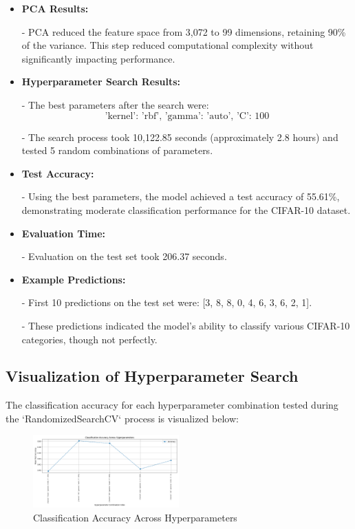 \documentclass[lettersize,journal]{IEEEtran}
\begin{document}
\begin{itemize}
    \item \textbf{PCA Results:}
    
    - PCA reduced the feature space from 3,072 to 99 dimensions, retaining 90\% of the variance. This step reduced computational complexity without significantly impacting performance.

    \item \textbf{Hyperparameter Search Results:}
    
    - The best parameters after the search were:
        \[
        \text{{'kernel': 'rbf', 'gamma': 'auto', 'C': 100}}
        \]
    
    - The search process took 10,122.85 seconds (approximately 2.8 hours) and tested 5 random combinations of parameters.

    \item \textbf{Test Accuracy:}
    
    - Using the best parameters, the model achieved a test accuracy of 55.61\%, demonstrating moderate classification performance for the CIFAR-10 dataset.

    \item \textbf{Evaluation Time:}
    
    - Evaluation on the test set took 206.37 seconds.

    \item \textbf{Example Predictions:}
    
    - First 10 predictions on the test set were: [3, 8, 8, 0, 4, 6, 3, 6, 2, 1].
    
    - These predictions indicated the model’s ability to classify various CIFAR-10 categories, though not perfectly.
\end{itemize}

\subsection{\textbf{Visualization of Hyperparameter Search}}
The classification accuracy for each hyperparameter combination tested during the `RandomizedSearchCV` process is visualized below:

\begin{figure}[H]
    \centering
    \includegraphics[width=0.5\textwidth]{classification_accuracy_hyperparameters.png}
    \caption{Classification Accuracy Across Hyperparameters}
    \label{fig:hyperparameter-accuracy}
\end{figure}
\end{document}
